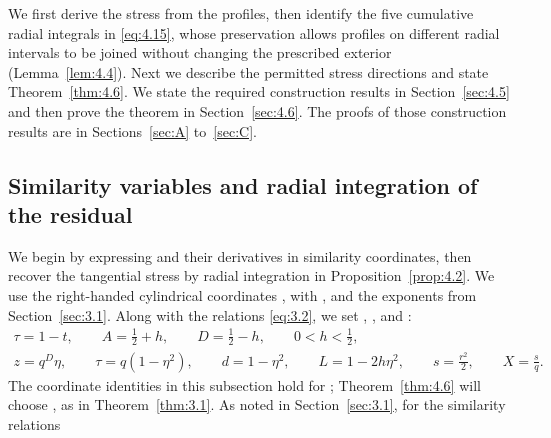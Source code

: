 We first derive the stress from the profiles, then identify the five cumulative radial integrals in \eqref{eq:4.15}, whose preservation allows profiles on different radial intervals to be joined without changing the prescribed exterior (Lemma~\ref{lem:4.4}). Next we describe the permitted stress directions and state Theorem~\ref{thm:4.6}. We state the required construction results in Section~\ref{sec:4.5} and then prove the theorem in Section~\ref{sec:4.6}. The proofs of those construction results are in Sections~\ref{sec:A} to~\ref{sec:C}.

\subsection{Similarity variables and radial integration of the residual}
\label{sec:4.1}

We begin by expressing  and their derivatives in similarity coordinates, then recover the tangential stress by radial integration in Proposition~\ref{prop:4.2}. We use the right-handed cylindrical coordinates , with , and the exponents  from Section~\ref{sec:3.1}. Along with the relations \eqref{eq:3.2}, we set , , and :
\begin{equation}
\begin{gathered}
\tau=1-t,\qquad A=\frac12+h,\qquad D=\frac12-h,\qquad 0<h<\frac12,\\
z=q^D\eta,\qquad \tau=q(1-\eta^2),\qquad d=1-\eta^2,\qquad L=1-2h\eta^2,\qquad s=\frac{r^2}{2},\qquad X=\frac{s}{q}.
\end{gathered}
\tag{4.1}\label{eq:4.1}
\end{equation}
The coordinate identities in this subsection hold for ; Theorem~\ref{thm:4.6} will choose , as in Theorem~\ref{thm:3.1}. As noted in Section~\ref{sec:3.1}, for  the similarity relations
